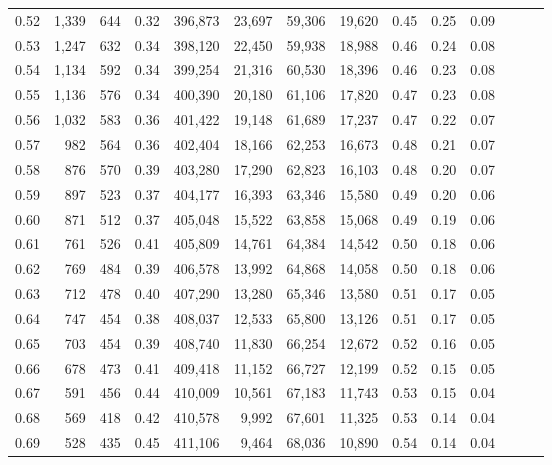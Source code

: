 \begin{tabular}{rrrrrrrrrrrrrr}
0.52 &   1,339 &    644 &  0.32 &  396,873 &   23,697 &  59,306 &  19,620 &  0.45 &  0.25 &      0.09 \\
0.53 &   1,247 &    632 &  0.34 &  398,120 &   22,450 &  59,938 &  18,988 &  0.46 &  0.24 &      0.08 \\
0.54 &   1,134 &    592 &  0.34 &  399,254 &   21,316 &  60,530 &  18,396 &  0.46 &  0.23 &      0.08 \\
0.55 &   1,136 &    576 &  0.34 &  400,390 &   20,180 &  61,106 &  17,820 &  0.47 &  0.23 &      0.08 \\
0.56 &   1,032 &    583 &  0.36 &  401,422 &   19,148 &  61,689 &  17,237 &  0.47 &  0.22 &      0.07 \\
0.57 &     982 &    564 &  0.36 &  402,404 &   18,166 &  62,253 &  16,673 &  0.48 &  0.21 &      0.07 \\
0.58 &     876 &    570 &  0.39 &  403,280 &   17,290 &  62,823 &  16,103 &  0.48 &  0.20 &      0.07 \\
0.59 &     897 &    523 &  0.37 &  404,177 &   16,393 &  63,346 &  15,580 &  0.49 &  0.20 &      0.06 \\
0.60 &     871 &    512 &  0.37 &  405,048 &   15,522 &  63,858 &  15,068 &  0.49 &  0.19 &      0.06 \\
0.61 &     761 &    526 &  0.41 &  405,809 &   14,761 &  64,384 &  14,542 &  0.50 &  0.18 &      0.06 \\
0.62 &     769 &    484 &  0.39 &  406,578 &   13,992 &  64,868 &  14,058 &  0.50 &  0.18 &      0.06 \\
0.63 &     712 &    478 &  0.40 &  407,290 &   13,280 &  65,346 &  13,580 &  0.51 &  0.17 &      0.05 \\
0.64 &     747 &    454 &  0.38 &  408,037 &   12,533 &  65,800 &  13,126 &  0.51 &  0.17 &      0.05 \\
0.65 &     703 &    454 &  0.39 &  408,740 &   11,830 &  66,254 &  12,672 &  0.52 &  0.16 &      0.05 \\
0.66 &     678 &    473 &  0.41 &  409,418 &   11,152 &  66,727 &  12,199 &  0.52 &  0.15 &      0.05 \\
0.67 &     591 &    456 &  0.44 &  410,009 &   10,561 &  67,183 &  11,743 &  0.53 &  0.15 &      0.04 \\
0.68 &     569 &    418 &  0.42 &  410,578 &    9,992 &  67,601 &  11,325 &  0.53 &  0.14 &      0.04 \\
0.69 &     528 &    435 &  0.45 &  411,106 &    9,464 &  68,036 &  10,890 &  0.54 &  0.14 &      0.04 \\

\end{tabular}
